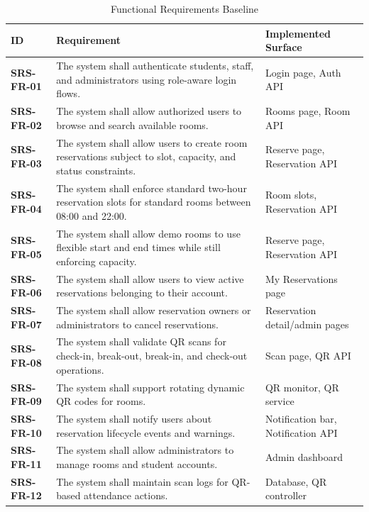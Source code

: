 \documentclass[conference]{IEEEtran}
\newcommand{\srs}[1]{\textbf{#1}}
\begin{document}
\begin{table}[htbp]
\caption{Functional Requirements Baseline}
\label{tab:functional}
\centering
\begin{tabularx}{\textwidth}{@{}lXl@{}}
\toprule
\textbf{ID} & \textbf{Requirement} & \textbf{Implemented Surface} \\
\midrule
\srs{SRS-FR-01} & The system shall authenticate students, staff, and
administrators using role-aware login flows. & Login page, Auth API \\
\srs{SRS-FR-02} & The system shall allow authorized users to browse and search
available rooms. & Rooms page, Room API \\
\srs{SRS-FR-03} & The system shall allow users to create room reservations
subject to slot, capacity, and status constraints. & Reserve page,
Reservation API \\
\srs{SRS-FR-04} & The system shall enforce standard two-hour reservation slots
for standard rooms between 08:00 and 22:00. & Room slots, Reservation API \\
\srs{SRS-FR-05} & The system shall allow demo rooms to use flexible start and
end times while still enforcing capacity. & Reserve page, Reservation API \\
\srs{SRS-FR-06} & The system shall allow users to view active reservations
belonging to their account. & My Reservations page \\
\srs{SRS-FR-07} & The system shall allow reservation owners or administrators
to cancel reservations. & Reservation detail/admin pages \\
\srs{SRS-FR-08} & The system shall validate QR scans for check-in, break-out,
break-in, and check-out operations. & Scan page, QR API \\
\srs{SRS-FR-09} & The system shall support rotating dynamic QR codes for rooms.
& QR monitor, QR service \\
\srs{SRS-FR-10} & The system shall notify users about reservation lifecycle
events and warnings. & Notification bar, Notification API \\
\srs{SRS-FR-11} & The system shall allow administrators to manage rooms and
student accounts. & Admin dashboard \\
\srs{SRS-FR-12} & The system shall maintain scan logs for QR-based attendance
actions. & Database, QR controller \\
\bottomrule
\end{tabularx}
\end{table}
\end{document}
